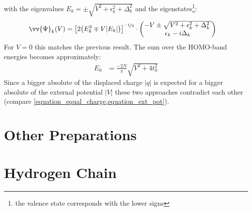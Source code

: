 with the eigenvalues $E_k = \pm \sqrt{V^2+\epsilon_k^2+\Delta_k^2}$ and the eigenstates\footnote{the valence state corresponds with the lower signs}:
\begin{align}
	\vv{\Psi}_k(V) &= \left[2\left(E_k^2\mp V|E_k|\right)\right]^{\nicefrac{-1}{2}} \cdot \begin{pmatrix*}[c]
	-V\pm \sqrt{V^2+\epsilon_k^2+\Delta_k^2}\\
	\epsilon_k - i \Delta_k
	\end{pmatrix*}
\end{align}
For $V=0$ this matches the previous result. 
The sum over the HOMO-band energies becomes approximately:
\begin{align}
	E_0 &= \frac{-2N}{\pi} \sqrt{V^2+4t_0^2}
	\label{equation_ext_pot}
\end{align} 
Since a bigger absolute of the displaced charge $\left|q\right|$ is expected for a bigger absolute of the external potential $\left|V\right|$ these two approaches contradict each other (compare \cref{equation_equal_charge,equation_ext_pot}).

\section{Other Preparations}
\begin{figure}[!h]
\centering
{}
\end{figure}




\section{Hydrogen Chain}

